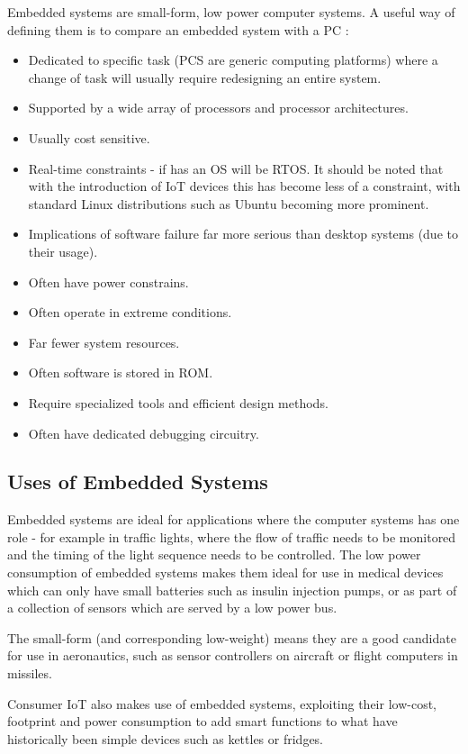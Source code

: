 Embedded systems are small-form, low power computer systems. A useful way of defining them is to compare an embedded system with a PC \cite{BergerArnold2002Esd:}:
\begin{itemize}
\item Dedicated to specific task (PCS are generic computing platforms) where a change of task will usually require redesigning an entire system.
\item Supported by a wide array of processors and processor architectures.
\item Usually cost sensitive.
\item Real-time constraints - if has an OS will be RTOS. It should be noted that with the introduction of IoT devices this has become less of a constraint, with standard Linux distributions such as Ubuntu becoming more prominent.
\item Implications of software failure far more serious than desktop systems (due to their usage).
\item Often have power constrains.
\item Often operate in extreme conditions.
\item Far fewer system resources.
\item Often software is stored in ROM.
\item Require specialized tools and efficient design methods.
\item Often have dedicated debugging circuitry.
\end{itemize}

\subsection{Uses of Embedded Systems}\label{usesEmbeddedSystems}

Embedded systems are ideal for applications where the computer systems has one role - for example in traffic lights, where the flow of traffic needs to be monitored and the timing of the light sequence needs to be controlled. The low power consumption of embedded systems makes them ideal for use in medical devices which can only have small batteries such as insulin injection pumps, or as part of a collection of sensors which are served by a low power bus.

The small-form (and corresponding low-weight) means they are a good candidate for use in aeronautics, such as sensor controllers on aircraft or flight computers in missiles.

Consumer IoT also makes use of embedded systems, exploiting their low-cost, footprint and power consumption to add smart functions to what have historically been simple devices such as kettles or fridges.


